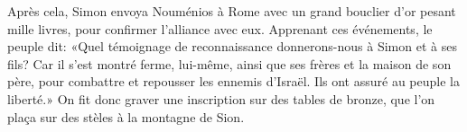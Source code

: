 Après cela, Simon envoya Nouménios à Rome
		avec un grand bouclier d’or pesant mille livres,
	pour confirmer l’alliance avec eux.
Apprenant ces événements, le peuple dit:
	«Quel témoignage de reconnaissance donnerons-nous à Simon et à ses fils?
Car il s’est montré ferme, lui-même, ainsi que ses frères et la maison de son père,
	pour combattre et repousser les ennemis d’Israël.
	Ils ont assuré au peuple la liberté.»
On fit donc graver une inscription sur des tables de bronze,
	que l’on plaça sur des stèles à la montagne de Sion.
